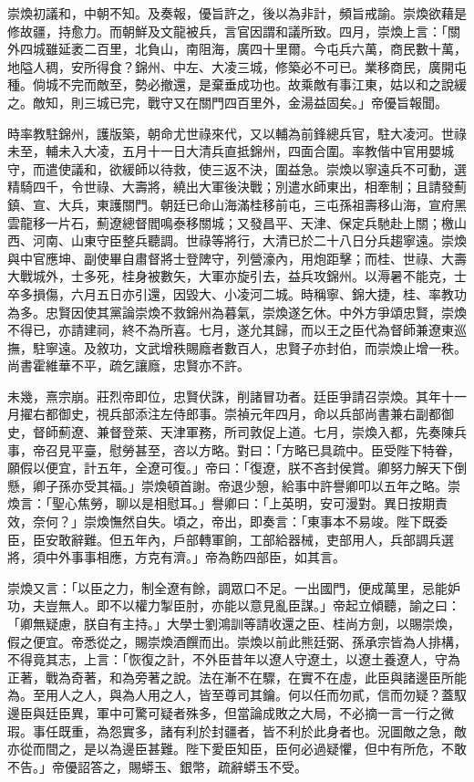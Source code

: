 \begin{pinyinscope}
崇煥初議和，中朝不知。及奏報，優旨許之，後以為非計，頻旨戒諭。崇煥欲藉是修故疆，持愈力。而朝鮮及文龍被兵，言官因謂和議所致。四月，崇煥上言：「關外四城雖延袤二百里，北負山，南阻海，廣四十里爾。今屯兵六萬，商民數十萬，地隘人稠，安所得食？錦州、中左、大凌三城，修築必不可已。業移商民，廣開屯種。倘城不完而敵至，勢必撤還，是棄垂成功也。故乘敵有事江東，姑以和之說緩之。敵知，則三城已完，戰守又在關門四百里外，金湯益固矣。」帝優旨報聞。

時率教駐錦州，護版築，朝命尤世祿來代，又以輔為前鋒總兵官，駐大凌河。世祿未至，輔未入大凌，五月十一日大清兵直抵錦州，四面合圍。率教偕中官用嬰城守，而遣使議和，欲緩師以待救，使三返不決，圍益急。崇煥以寧遠兵不可動，選精騎四千，令世祿、大壽將，繞出大軍後決戰；別遣水師東出，相牽制；且請發薊鎮、宣、大兵，東護關門。朝廷已命山海滿桂移前屯，三屯孫祖壽移山海，宣府黑雲龍移一片石，薊遼總督閻鳴泰移關城；又發昌平、天津、保定兵馳赴上關；檄山西、河南、山東守臣整兵聽調。世祿等將行，大清已於二十八日分兵趨寧遠。崇煥與中官應坤、副使畢自肅督將士登陴守，列營濠內，用炮距擊；而桂、世祿、大壽大戰城外，士多死，桂身被數矢，大軍亦旋引去，益兵攻錦州。以溽暑不能克，士卒多損傷，六月五日亦引還，因毀大、小凌河二城。時稱寧、錦大捷，桂、率教功為多。忠賢因使其黨論崇煥不救錦州為暮氣，崇煥遂乞休。中外方爭頌忠賢，崇煥不得已，亦請建祠，終不為所喜。七月，遂允其歸，而以王之臣代為督師兼遼東巡撫，駐寧遠。及敘功，文武增秩賜廕者數百人，忠賢子亦封伯，而崇煥止增一秩。尚書霍維華不平，疏乞讓廕，忠賢亦不許。

未幾，熹宗崩。莊烈帝即位，忠賢伏誅，削諸冒功者。廷臣爭請召崇煥。其年十一月擢右都御史，視兵部添注左侍郎事。崇禎元年四月，命以兵部尚書兼右副都御史，督師薊遼、兼督登萊、天津軍務，所司敦促上道。七月，崇煥入都，先奏陳兵事，帝召見平臺，慰勞甚至，咨以方略。對曰：「方略已具疏中。臣受陛下特眷，願假以便宜，計五年，全遼可復。」帝曰：「復遼，朕不吝封侯賞。卿努力解天下倒懸，卿子孫亦受其福。」崇煥頓首謝。帝退少憩，給事中許譽卿叩以五年之略。崇煥言：「聖心焦勞，聊以是相慰耳。」譽卿曰：「上英明，安可漫對。異日按期責效，奈何？」崇煥憮然自失。頃之，帝出，即奏言：「東事本不易竣。陛下既委臣，臣安敢辭難。但五年內，戶部轉軍餉，工部給器械，吏部用人，兵部調兵選將，須中外事事相應，方克有濟。」帝為飭四部臣，如其言。

崇煥又言：「以臣之力，制全遼有餘，調眾口不足。一出國門，便成萬里，忌能妒功，夫豈無人。即不以權力掣臣肘，亦能以意見亂臣謀。」帝起立傾聽，諭之曰：「卿無疑慮，朕自有主持。」大學士劉鴻訓等請收還之臣、桂尚方劍，以賜崇煥，假之便宜。帝悉從之，賜崇煥酒饌而出。崇煥以前此熊廷弼、孫承宗皆為人排構，不得竟其志，上言：「恢復之計，不外臣昔年以遼人守遼土，以遼土養遼人，守為正著，戰為奇著，和為旁著之說。法在漸不在驟，在實不在虛，此臣與諸邊臣所能為。至用人之人，與為人用之人，皆至尊司其鑰。何以任而勿貳，信而勿疑？蓋馭邊臣與廷臣異，軍中可驚可疑者殊多，但當論成敗之大局，不必摘一言一行之微瑕。事任既重，為怨實多，諸有利於封疆者，皆不利於此身者也。況圖敵之急，敵亦從而間之，是以為邊臣甚難。陛下愛臣知臣，臣何必過疑懼，但中有所危，不敢不告。」帝優詔答之，賜蟒玉、銀幣，疏辭蟒玉不受。


\end{pinyinscope}
